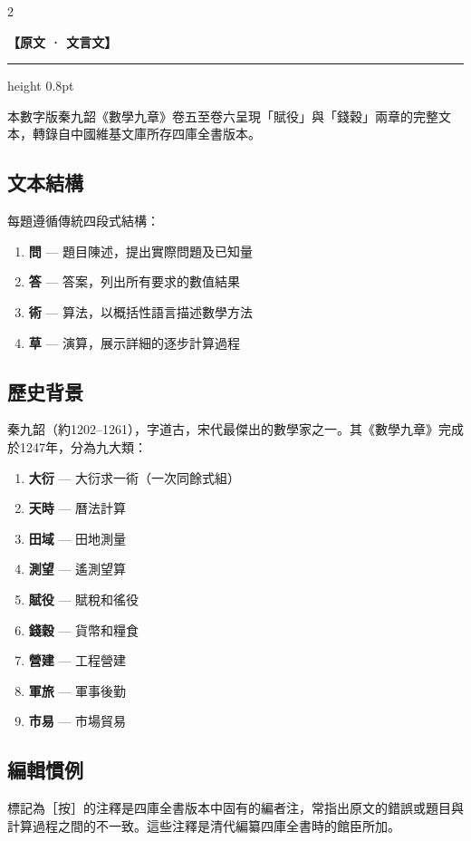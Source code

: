 \documentclass[11pt,a4paper]{article}
\newcommand{\ClassicalHeader}{%
  \begin{center}\textbf{\color{headerclassical}【原文 · 文言文】}\end{center}
  \vspace{-0.5em}
  \hrule height 0.8pt
  \vspace{0.5em}
}
\begin{document}
\begin{paracol}{2}

\ClassicalHeader

本數字版秦九韶《數學九章》卷五至卷六呈現「賦役」與「錢穀」兩章的完整文本，轉錄自中國維基文庫所存四庫全書版本。

\subsection*{文本結構}

每題遵循傳統四段式結構：

\begin{enumerate}
\item \textbf{問} — 題目陳述，提出實際問題及已知量
\item \textbf{答} — 答案，列出所有要求的數值結果
\item \textbf{術} — 算法，以概括性語言描述數學方法
\item \textbf{草} — 演算，展示詳細的逐步計算過程
\end{enumerate}

\subsection*{歷史背景}

秦九韶（約1202--1261），字道古，宋代最傑出的數學家之一。其《數學九章》完成於1247年，分為九大類：

\begin{enumerate}
\item \textbf{大衍} — 大衍求一術（一次同餘式組）
\item \textbf{天時} — 曆法計算
\item \textbf{田域} — 田地測量
\item \textbf{測望} — 遙測望算
\item \textbf{賦役} — 賦稅和徭役
\item \textbf{錢穀} — 貨幣和糧食
\item \textbf{營建} — 工程營建
\item \textbf{軍旅} — 軍事後勤
\item \textbf{市易} — 市場貿易
\end{enumerate}

\subsection*{編輯慣例}

標記為［按］的注釋是四庫全書版本中固有的編者注，常指出原文的錯誤或題目與計算過程之間的不一致。這些注釋是清代編纂四庫全書時的館臣所加。


\end{paracol}
\end{document}
